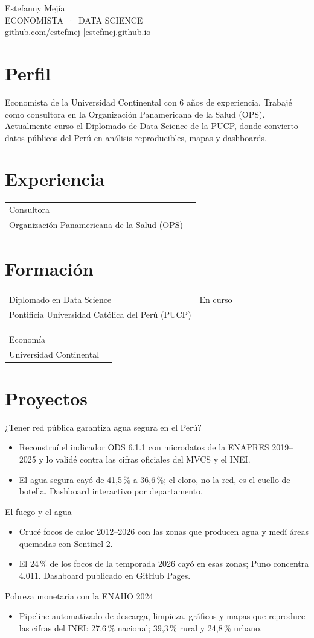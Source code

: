 \documentclass[10.5pt]{article}
\makeatletter
\newcommand{\serif}[1]{{\fontfamily{ppl}\selectfont #1}}
\newcommand{\entrada}[3]{%
  \begin{tabularx}{\linewidth}{@{}X r@{}}
    \serif{\large #1} & {\small\color{oro}#3}\\
    {\color{suave}#2} & \\
  \end{tabularx}\vspace{4pt}}
\makeatother
\begin{document}
\begin{center}
  {\selectfont\fontsize{30}{34}\selectfont Estefanny Mejía}\\[4pt]
  {\small\color{oro}ECONOMISTA \,·\, DATA SCIENCE}\\[6pt]
  {\small\color{suave}\href{https://github.com/estefmej}{github.com/estefmej} \quad|\quad \href{https://estefmej.github.io}{estefmej.github.io}}
\end{center}

\section{Perfil}
Economista de la Universidad Continental con 6 años de experiencia. Trabajé como consultora en la
Organización Panamericana de la Salud (OPS). Actualmente curso el Diplomado de Data Science de la PUCP,
donde convierto datos públicos del Perú en análisis reproducibles, mapas y dashboards.

\section{Experiencia}
\entrada{Consultora}{Organización Panamericana de la Salud (OPS)}{}

\section{Formación}
\entrada{Diplomado en Data Science}{Pontificia Universidad Católica del Perú (PUCP)}{En curso}
\entrada{Economía}{Universidad Continental}{}

\section{Proyectos}
\serif{\large ¿Tener red pública garantiza agua segura en el Perú?}
\begin{itemize}
  \item Reconstruí el indicador ODS 6.1.1 con microdatos de la ENAPRES 2019--2025 y lo validé contra las cifras oficiales del MVCS y el INEI.
  \item El agua segura cayó de 41,5\,\% a 36,6\,\%; el cloro, no la red, es el cuello de botella. Dashboard interactivo por departamento.
\end{itemize}
\vspace{4pt}
\serif{\large El fuego y el agua}
\begin{itemize}
  \item Crucé focos de calor 2012--2026 con las zonas que producen agua y medí áreas quemadas con Sentinel-2.
  \item El 24\,\% de los focos de la temporada 2026 cayó en esas zonas; Puno concentra 4.011. Dashboard publicado en GitHub Pages.
\end{itemize}
\vspace{4pt}
\serif{\large Pobreza monetaria con la ENAHO 2024}
\begin{itemize}
  \item Pipeline automatizado de descarga, limpieza, gráficos y mapas que reproduce las cifras del INEI: 27,6\,\% nacional; 39,3\,\% rural y 24,8\,\% urbano.
\end{itemize}
\end{document}
